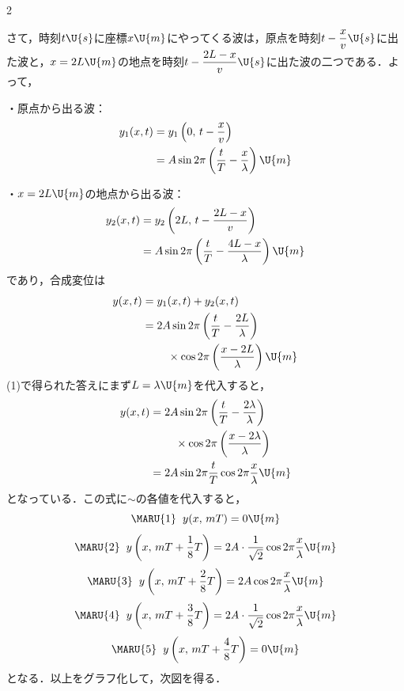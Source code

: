 \begin{multicols}{2}
\begin{komon}
       さて，時刻$t\U{s}$に座標$x\U{m}$にやってくる波は，原点を時刻$t-\dfrac{x}{v}\U{s}$に出た波と，$x=2L\U{m}$の地点を時刻$t-\dfrac{2L-x}{v}\U{s}$に出た波の二つである．よって，

       ・原点から出る波：
       \[\begin{aligned}y_1(x,t)&=y_1\left(0,\,t-\frac{x}{v}\right)\\&=A\sin 2\pi\left(\frac{t}{T}-\frac{x}{\lambda}\right)\U{m}\end{aligned}\]

       ・$x=2L\U{m}$の地点から出る波：
       \[\begin{aligned}y_2(x,t)&=y_2\left(2L,\,t-\frac{2L-x}{v}\right)\\&=A\sin 2\pi\left(\frac{t}{T}-\frac{4L-x}{\lambda}\right)\U{m}\end{aligned}\]
       であり，合成変位は
       \[\begin{aligned}y(x,t)&=y_1(x,t)+y_2(x,t)\\&=2A\sin 2\pi\left(\frac{t}{T}-\frac{2L}{\lambda}\right)\\&\hspace{8mm}\times\cos 2\pi\left(\frac{x-2L}{\lambda}\right)\U{m}\end{aligned}\]
       \hspace*{\fill}\Ans
{} (1)で得られた答えにまず$L=\lambda\U{m}$を代入すると，
       \[\begin{aligned}y(x,t)&=2A\sin 2\pi\left(\frac{t}{T}-\frac{2\lambda}{\lambda}\right)\\&\hspace{8mm}\times\cos 2\pi\left(\frac{x-2\lambda}{\lambda}\right)\\&=2A\sin 2\pi\frac{t}{T}\cos 2\pi\frac{x}{\lambda}\U{m}\end{aligned}\]
       となっている．この式に$\sim$の各値を代入すると，
       \[\MARU{1}\hspace{2mm}y(x,\,mT)=0\U{m}\]
       \[\MARU{2}\hspace{2mm}y\left(x,\,mT+\frac{1}{8}T\right)=2A\cdot\frac{1}{\sqrt{2}}\cos 2\pi\frac{x}{\lambda}\U{m}\]
       \[\MARU{3}\hspace{2mm}y\left(x,\,mT+\frac{2}{8}T\right)=2A\cos 2\pi\frac{x}{\lambda}\U{m}\]
       \[\MARU{4}\hspace{2mm}y\left(x,\,mT+\frac{3}{8}T\right)=2A\cdot\frac{1}{\sqrt{2}}\cos 2\pi\frac{x}{\lambda}\U{m}\]
       \[\MARU{5}\hspace{2mm}y\left(x,\,mT+\frac{4}{8}T\right)=0\U{m}\]
       となる．以上をグラフ化して，次図を得る．

\end{komon}
\end{multicols}
